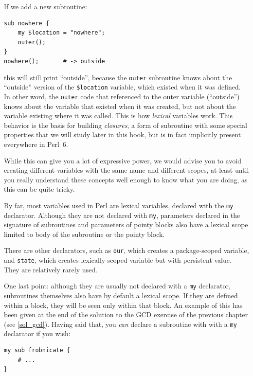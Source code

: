 If we add a new subroutine:
\begin{verbatim}
sub nowhere {
    my $location = "nowhere";
    outer();
}
nowhere();       # -> outside
\end{verbatim}
% 
this will still print ``outside'', because the {\tt outer} 
subroutine knows about the ``outside'' version of the 
{\tt \$location} variable, which existed when it was defined.
In other word, the {\tt outer} code that referenced to the 
outer variable (``outside'') knows about the variable that existed 
when it was created, but not about the variable existing where 
it was called. This is how \emph{lexical} variables work. 
This behavior is the basis for building \emph{closures}, a  
form of subroutine with some special properties that we 
will study later in this book, but 
is in fact implicitly present everywhere in Perl~6.

While this can give you a lot of expressive power, we would 
advise you to avoid creating different variables with the 
same name and different scopes, at least until you really understand 
these concepts well enough to know what you are doing, as this 
can be quite tricky.

By far, most variables used in Perl are lexical variables, 
declared with the {\tt my} declarator. Although they are 
not declared with {\tt my}, parameters declared 
in the signature of subroutines and parameters of pointy 
blocks also have a lexical scope limited to body of the 
subroutine or the pointy block.

There are other declarators, such as {\tt our}, which creates 
a package-scoped variable, and {\tt state}, which creates 
lexically scoped variable but with persistent value. They 
are relatively rarely used.

One last point: although they are usually not declared with 
a {\tt my} declarator, subroutines themselves also have by default
a lexical scope. If they are defined within a block, they will 
be seen only within that block. An example of this has been 
given at the end of the solution to the GCD exercise of the 
previous chapter (see \ref{sol_gcd}). 
Having said that, you \emph{can} declare a subroutine with 
with a {\tt my} declarator if you wish:

\begin{verbatim}
my sub frobnicate { 
    # ... 
}
\end{verbatim}

